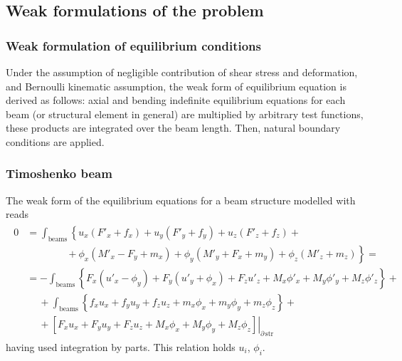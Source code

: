 \documentclass[letterpaper,10pt,english]{jupyterBook}
\begin{document}
\subsection{Weak formulations of the problem}
\label{\detokenize{ch/solids/small-displacements-statics-beams-weak-form:weak-formulations-of-the-problem}}\label{\detokenize{ch/solids/small-displacements-statics-beams-weak-form:solid-mechanics-intro-small-displacements-statics-beam-weak-form-weak}}

\subsubsection{Weak formulation of equilibrium conditions}
\label{\detokenize{ch/solids/small-displacements-statics-beams-weak-form:weak-formulation-of-equilibrium-conditions}}\label{\detokenize{ch/solids/small-displacements-statics-beams-weak-form:solid-mechanics-intro-small-displacements-statics-beam-weak-form-weak-equilibrium}}
\sphinxAtStartPar
Under the assumption of negligible contribution of shear stress and deformation, and Bernoulli kinematic assumption, the weak form of equilibrium equation is derived as follows: axial and bending indefinite equilibrium equations for each beam (or structural element in general) are multiplied by arbitrary test functions, these products are integrated over the beam length. Then, natural boundary conditions are applied.
\subsubsection*{Timoshenko beam }

\sphinxAtStartPar
The weak form of the equilibrium equations for a beam structure modelled with {\hyperref[\detokenize{ch/solids/beams/timoshenko:solid-mechanics-small-displacements-beams-timoshenko}]{}} reads
\begin{equation*}
\begin{split}\begin{aligned}
  0 & = \int_{\text{beams}} \left\{ u_x ( F'_x + f_x ) + u_y ( F'_y + f_y ) + u_z ( F'_z + f_z ) + \right. \\
    & \qquad \qquad + \left. \phi_x (M'_x - F_y + m_x) + \phi_y(M'_y + F_x + m_y) + \phi_z (M'_z + m_z) \right\} = \\
    & = - \int_{\text{beams}} \left\{ F_x ( u'_x - \phi_y ) + F_y ( u'_y + \phi_x ) + F_z u'_z + M_x \phi'_x + M_y \phi'_y + M_z \phi'_z \right\} + \\
    & \quad \ + \int_{\text{beams}} \left\{ f_x u_x + f_y u_y + f_z u_z + m_x \phi_x + m_y \phi_y + m_z \phi_z \right\} + \\
    & \quad \ + \left. \left[ F_x u_x + F_y u_y + F_z u_z + M_x \phi_x + M_y \phi_y + M_z \phi_z \right]\right|_{\partial \, \text{str}}
\end{aligned}\end{split}
\end{equation*}
\sphinxAtStartPar
having used integration by parts. This relation holds  \(u_i\), \(\phi_i\).
\end{document}
